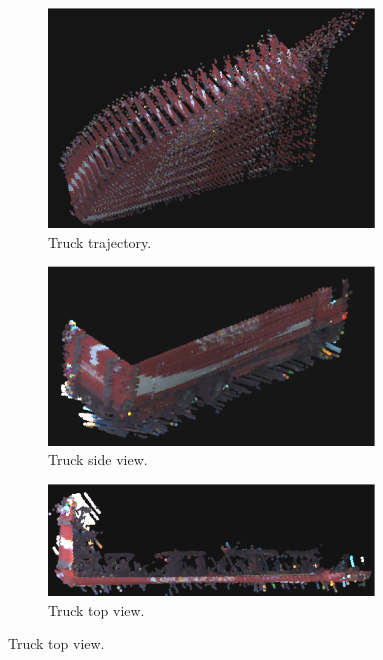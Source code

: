 \documentclass[10pt,twocolumn,letterpaper]{article}  %
\begin{document}
\begin{figure}[thpb]
  	
	\begin{subfigure}{0.333\textwidth}
  	\centering
 	\includegraphics[height=0.05\textheight, width=0.95\textwidth]{image/truck_traj_bright.eps}%
  	\caption{Truck trajectory.}
  	\label{fig:truck_traj}
	\end{subfigure}%
	\begin{subfigure}{0.334\textwidth}
 	\centering
  	\includegraphics[height=0.05\textheight, width=0.95\textwidth]{image/truck_side_bright.eps}%
  	\caption{Truck side view.}
  	\label{fig:truck_side_bright} 
  	\end{subfigure}%
  	\begin{subfigure}{0.333\textwidth}
  	\centering
 	\includegraphics[height=0.05\textheight, width=0.95\textwidth]{image/truck_top_bright.eps}%
  	\caption{Truck top view.}
  	\label{fig:truck_top_bright}
	\end{subfigure}%
	

\end{figure}
\end{document}
